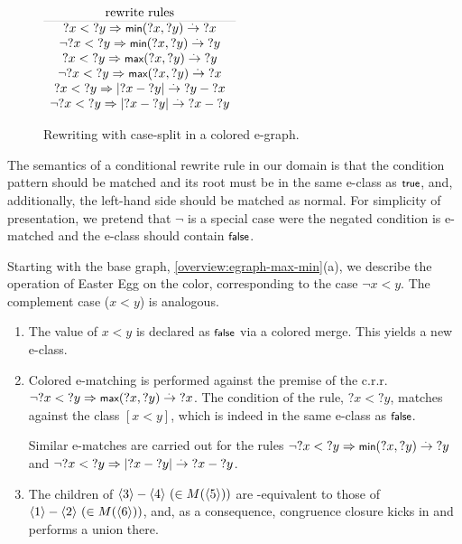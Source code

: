 \begin{example}
\begin{figure*}[t]
\begin{center}
\begin{tabular}{L{4.5cm}l@{}}
\end{tabular}
%    
\\
$\begin{array}{c}
        \mbox{rewrite rules} \\ \arrayrulecolor{gray!50!white}\hline
        {?x} < {?y} \Rightarrow \tmin({?x}, {?y}) \rwto {?x} \\
        \lnot{?x} < {?y} \Rightarrow \tmin({?x}, {?y}) \rwto {?y} \\
        {?x} < {?y} \Rightarrow \tmax({?x}, {?y}) \rwto {?y} \\
        \lnot{?x} < {?y} \Rightarrow \tmax({?x}, {?y}) \rwto {?x} \\
        {?x} < {?y} \Rightarrow |{?x} - {?y}| \rwto {?y} - {?x} \\
        \lnot{?x} < {?y} \Rightarrow |{?x} - {?y}| \rwto {?x} - {?y} \\
\end{array}$
\caption{\label{overview:colored:example}
    Rewriting with case-split in a colored e-graph.}

\end{center}
\end{figure*}

The semantics of a conditional rewrite rule in our domain is that the condition pattern should be matched and its root must be in the same e-class as $\ttrue$, and, additionally, the left-hand side should be matched as normal.
For simplicity of presentation, we pretend that $\lnot$ is a special case were the negated condition is e-matched and the e-class should contain $\tfalse$.

\smallskip
Starting with the base graph, \autoref{overview:egraph-max-min}(a), we describe the operation of Easter Egg
on the \cred color, corresponding to the case $\lnot x < y$.
The complement \cblue case ($x < y$) is analogous.

\begin{enumerate}[leftmargin=1.5em]
\item
    The value of $x < y$ is declared as $\tfalse$ via
    a colored merge.
    This yields a new \cred e-class.
\item
    Colored e-matching is performed against the premise of the c.r.r. $\lnot {?x} < {?y} \Rightarrow \tmax({?x}, {?y}) \rwto {?x}$.
    The condition of the rule, ${?x} < {?y}$, matches against the class $[x < y]$, 
    which is indeed in the same \cred e-class as $\tfalse$.
    
    Similar e-matches are carried out for the rules
    $\lnot {?x} < {?y} \Rightarrow \tmin({?x}, {?y}) \rwto {?y}$
    and
    $\lnot {?x} < {?y} \Rightarrow |{?x} - {?y}| \overset{.\,}{\rightarrow} {?x} - {?y}$.
\item
    The children of $\langle 3\rangle - \langle 4\rangle ~(\in M(\langle 5\rangle))$ are \cred-equivalent to those of $\langle 1\rangle - \langle 2\rangle ~(\in M(\langle 6\rangle))$, and,
    as a consequence, \cred congruence closure kicks in and performs a \cred union there.
\end{enumerate}


\end{example}
